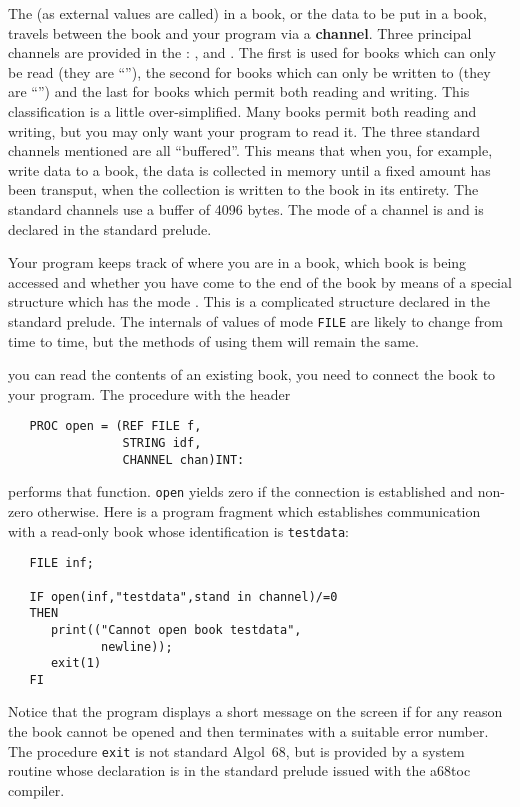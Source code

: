 The  (as external values are called) in a book, or the
data to be put in a book, travels between the book and your program
via a \textbf{channel}.  Three principal channels are provided in the
: ,
 and .  The first is
used for books which can only be read (they are ``''),
the second for books which can only be written to (they are
``'') and the last for books which permit both reading
and writing.  This classification is a little over-simplified.  Many
books permit both reading and writing, but you may only want your
program to read it. The three standard channels mentioned are all
``buffered''. This means that when you, for example, write data to a
book, the data is collected in memory until a fixed amount has been
transput, when the collection is written to the book in its entirety.
The standard channels use a buffer of 4096 bytes.  The mode of a
channel is  and is declared in the standard prelude.

Your program keeps track of where you are in a book, which book is
being accessed and whether you have come to the end of the book by
means of a special structure which has the mode . This is
a complicated structure declared in the standard prelude. The
internals of values of mode \verb|FILE| are likely to change from
time to time, but the methods of using them will remain the same.

 you can read the contents of an existing
book, you need to connect the book to your program. The
procedure  with the header
\begin{verbatim}
   PROC open = (REF FILE f,
                STRING idf,
                CHANNEL chan)INT:
\end{verbatim}
\noindent
performs that function.  \verb|open| yields zero if the
connection is established and non-zero otherwise. Here is a program
fragment which establishes communication with a read-only book whose
identification is \verb|testdata|:
\begin{verbatim}
   FILE inf;

   IF open(inf,"testdata",stand in channel)/=0
   THEN
      print(("Cannot open book testdata",
             newline));
      exit(1)
   FI
\end{verbatim}
\noindent
Notice that the program displays a short message on the screen if for
any reason the book cannot be opened and then terminates with a
suitable error number. The procedure \verb|exit| is not standard
Algol~68, but is provided by a system routine whose declaration is in
the standard prelude issued with the a68toc compiler.


